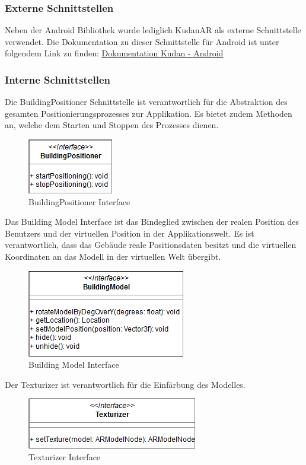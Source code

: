 \documentclass[a4paper]{scrreprt}
\begin{document}
\subsubsection{Externe Schnittstellen}
Neben der Android Bibliothek wurde lediglich KudanAR als externe Schnittstelle verwendet. Die Dokumentation zu dieser Schnittstelle für Android ist unter folgendem Link zu finden:
\href{https://www.kudan.eu/docs-reference/AndroidDocs/annotated.html}{Dokumentation Kudan - Android}


\subsubsection{Interne Schnittstellen}

Die BuildingPositioner Schnittstelle ist verantwortlich für die Abstraktion des gesamten Positionierungsprozesses zur Applikation. Es bietet zudem Methoden an, welche dem Starten und Stoppen des Prozesses dienen.
\begin{figure}[h!]
	\center
	\includegraphics[scale=0.6]{BuildingPositioner.png}
	\caption{BuildingPositioner Interface}
\end{figure}
\clearpage
Das Building Model Interface ist das Bindeglied zwischen der realen Position des Benutzers und der virtuellen Position in der Applikationswelt. Es ist verantwortlich, dass das Gebäude reale Positionsdaten besitzt und die virtuellen Koordinaten an das Modell in der virtuellen Welt übergibt.

\begin{figure}[h!]
	\center
	\includegraphics[scale=0.6]{BuildingModel.png}
	\caption{Building Model Interface}
\end{figure}

Der Texturizer ist verantwortlich für die Einfärbung des Modelles.
\begin{figure}[h!]
	\center
	\includegraphics[scale=0.6]{Texturizer.png}
	\caption{Texturizer Interface}
\end{figure}
\end{document}
